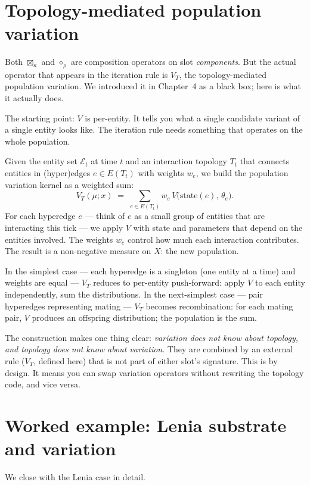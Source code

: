 \section{Topology-mediated population variation}

Both $\boxtimes_\kappa$ and $\diamond_\rho$ are composition operators
on slot \emph{components}. But the actual operator that appears in the
iteration rule is $V_T$, the topology-mediated population variation. We
introduced it in Chapter~4 as a black box; here is what it actually
does.

The starting point: $V$ is per-entity. It tells you what a single
candidate variant of a single entity looks like. The iteration rule
needs something that operates on the whole population.

Given the entity set $\mathcal{E}_t$ at time $t$ and an interaction
topology $T_t$ that connects entities in (hyper)edges $e \in E(T_t)$
with weights $w_e$, we build the population variation kernel as a
weighted sum:
\[
  V_T(\mu; x) \;=\; \sum_{e \in E(T_t)} w_e \,
                    V\!\big(\mathrm{state}(e),\, \theta_e\big).
\]
For each hyperedge $e$ --- think of $e$ as a small group of entities
that are interacting this tick --- we apply $V$ with state and
parameters that depend on the entities involved. The weights $w_e$
control how much each interaction contributes. The result is a
non-negative measure on $X$: the new population.

In the simplest case --- each hyperedge is a singleton (one entity at a
time) and weights are equal --- $V_T$ reduces to per-entity
push-forward: apply $V$ to each entity independently, sum the
distributions. In the next-simplest case --- pair hyperedges
representing mating --- $V_T$ becomes recombination: for each mating
pair, $V$ produces an offspring distribution; the population is the
sum.

The construction makes one thing clear: \emph{variation does not know
about topology, and topology does not know about variation}. They are
combined by an external rule ($V_T$, defined here) that is not part of
either slot's signature. This is by design. It means you can swap
variation operators without rewriting the topology code, and vice
versa.

\section{Worked example: Lenia substrate and variation}

We close with the Lenia case in detail.

